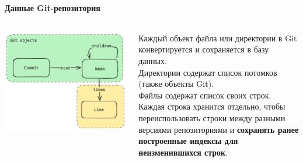 \documentclass[aspectratio=169,professionalfonts,10pt]{beamer}
\begin{document}
\begin{frame}{\insertsection}
\framesubtitle{Данные Git-репозитория}

\begin{columns}
    \begin{column}{0.5\textwidth}
        \includegraphics[width=\textwidth]{figures/model-git.png}
    \end{column}
    \begin{column}{0.5\textwidth}
        Каждый объект файла или директории в Git конвертируется и сохраняется в базу данных.\\[\baselineskip]
        
        Директории содержат список потомков (также объекты Git).\\[\baselineskip]
        
        Файлы содержат список своих строк. Каждая строка хранится отдельно, чтобы переиспользовать строки между разными версиями репозиториями и \textbf{сохранять ранее построенные индексы для неизменившихся строк}.
    \end{column}
\end{columns}

\end{frame}
\end{document}
